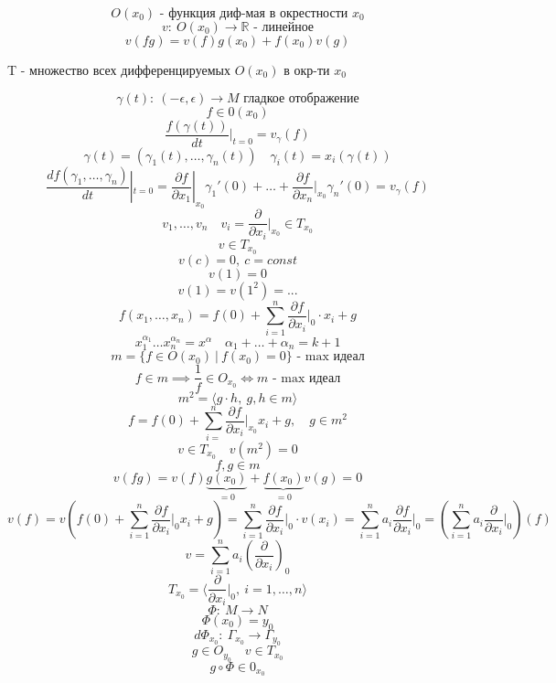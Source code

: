 \documentclass[a4paper]{article}
\theoremstyle{definition}
\begin{document}
\[
    O(x_0) \text{ - функция диф-мая в окрестности } x_0
\]
\[
    v: \ O(x_0) \to \mathbb{R} \text{ - линейное}
\]
\[
    v(fg) = v(f) g(x_0) + f(x_0)v(g)
\]

T - множество всех дифференцируемых $ O(x_0) $ в окр-ти $ x_0 $ 

\[
    \gamma(t) : \ (- \epsilon, \epsilon) \to M \text{ гладкое отображение}
\]
\[
    f \in 0(x_0)
\]
\[
    \frac{f(\gamma(t))}{dt} |_{t = 0} = v_{\gamma}(f)
\]
\[
    \gamma(t) = (\gamma_1(t), \dots, \gamma_n(t)) \quad \gamma_i(t) = x_i(\gamma(t))
\]
\[
    \frac{df(\gamma_1, \dots, \gamma_n)}{dt} |_{t=0} = 
    \frac{\partial f}{\partial x_1} |_{x_0} \gamma_1'(0) +
    \dots +\frac{\partial f}{\partial x_n} |_{x_0} \gamma_n'(0)
    = v_{\gamma}(f)
\]
\[
    v_1, \dots, v_n \quad v_i = \frac{\partial}{\partial x_i} |_{x_0} \in T_{x_0}
\]
\[
    v \in T_{x_0}
\]
\[
    v(c) = 0, \ c = const
\]
\[
    v(1) = 0
\]
\[
    v(1) = v(1^2) =  ...
\]
\[
    f(x_1, \dots, x_n) = f(0) + \sum_{i=1}^{n} \frac{\partial f}{\partial x_i} 
    |_{0} \cdot x_i + g
\]
\[
    x_1^{\alpha_1} \dots x_n^{\alpha_n} = x^\alpha \quad \alpha_1 + \dots + 
    \alpha_n = k + 1
\]
\[
    m = \{ f \in O(x_0) \ | \ f(x_0) = 0 \} \text{ - max идеал}
\]
\[
    f \in m \implies \frac{1}{f} \in O_{x_0} \iff m \text{ - max идеал}
\]
\[
    m^2  = \langle g \cdot h, \ g,h \in m \rangle
\]
\[
    f = f(0) + \sum_{i= }^{n} \frac{\partial f}{\partial x_i} |_{x_0} x_i + g,
    \quad g \in m^2
\]
\[
    v \in T_{x_0} \quad v(m^2) = 0
\]
\[
    f,g \in m
\]
\[
    v(fg) = v(f) \underbrace{g(x_0)}_{=0} + \underbrace{f(x_0)}_{=0} v(g) = 0
\]
\[
    v(f) = v(f(0) + \sum_{i=1}^{n} \frac{\partial f}{\partial x_i} \big|_0 x_i + g)
    = \sum_{i=1}^{n} \frac{\partial f}{\partial x_i} \big|_0 \cdot v(x_i)
    = \sum_{i=1}^{n} a_i \frac{\partial f}{\partial x_i} \big|_0
    = \left(\sum_{i=1}^{n} a_i\frac{\partial}{\partial x_i} \big|_0 \right) (f)
\]
\[
    v = \sum_{i=1}^{n} a_i \left(\frac{\partial}{\partial x_i} \right)_0
\]
\[
    T_{x_0} = \langle \frac{\partial}{\partial x_i} \big|_0, \ i = 1, \dots, n \rangle 
\]
\[
    \Phi: \ M \to N
\]
\[
    \Phi(x_0) = y_0
\]
\[
    d \Phi_{x_0} : \ \Gamma_{x_0} \to \Gamma_{y_0}
\]
\[
    g \in O_{y_0} \quad v \in T_{x_0}
\]
\[
    g \circ \Phi \in 0_{x_0}
\]
\end{document}
